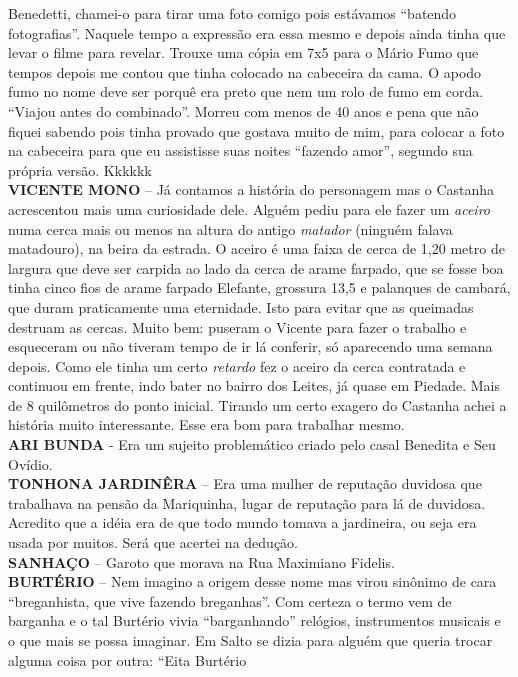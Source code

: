 \documentclass[12pt,brazil,]{book}
\begin{document}
Benedetti, chamei-o para tirar uma foto comigo pois estávamos ``batendo
fotografias''. Naquele tempo a expressão era essa mesmo e depois ainda
tinha que levar o filme para revelar. Trouxe uma cópia em 7x5 para o
Mário Fumo que tempos depois me contou que tinha colocado na cabeceira
da cama. O apodo fumo no nome deve ser porquê era preto que nem um rolo
de fumo em corda. ``Viajou antes do combinado''. Morreu com menos de 40
anos e pena que não fiquei sabendo pois tinha provado que gostava muito
de mim, para colocar a foto na cabeceira para que eu assistisse suas
noites ``fazendo amor'', segundo sua própria versão. Kkkkkk\\
\textbf{VICENTE MONO} -- Já contamos a história do personagem mas o
Castanha acrescentou mais uma curiosidade dele. Alguém pediu para ele
fazer um \emph{aceiro} numa cerca mais ou menos na altura do antigo
\emph{matador} (ninguém falava matadouro), na beira da estrada. O aceiro
é uma faixa de cerca de 1,20 metro de largura que deve ser carpida ao
lado da cerca de arame farpado, que se fosse boa tinha cinco fios de
arame farpado Elefante, grossura 13,5 e palanques de cambará, que duram
praticamente uma eternidade. Isto para evitar que as queimadas destruam
as cercas. Muito bem: puseram o Vicente para fazer o trabalho e
esqueceram ou não tiveram tempo de ir lá conferir, só aparecendo uma
semana depois. Como ele tinha um certo \emph{retardo} fez o aceiro da
cerca contratada e continuou em frente, indo bater no bairro dos Leites,
já quase em Piedade. Mais de 8 quilômetros do ponto inicial. Tirando um
certo exagero do Castanha achei a história muito interessante. Esse era
bom para trabalhar mesmo.\\
\textbf{ARI BUNDA} - Era um sujeito problemático criado pelo casal
Benedita e Seu Ovídio.\\
\textbf{TONHONA JARDINÊRA} -- Era uma mulher de reputação duvidosa que
trabalhava na pensão da Mariquinha, lugar de reputação para lá de
duvidosa. Acredito que a idéia era de que todo mundo tomava a
jardineira, ou seja era usada por muitos. Será que acertei na dedução.\\
\textbf{SANHAÇO} -- Garoto que morava na Rua Maximiano Fidelis.\\
\textbf{BURTÉRIO} -- Nem imagino a origem desse nome mas virou sinônimo
de cara ``breganhista, que vive fazendo breganhas''. Com certeza o termo
vem de barganha e o tal Burtério vivia ``barganhando'' relógios,
instrumentos musicais e o que mais se possa imaginar. Em Salto se dizia
para alguém que queria trocar alguma coisa por outra: ``Eita Burtério
\end{document}
